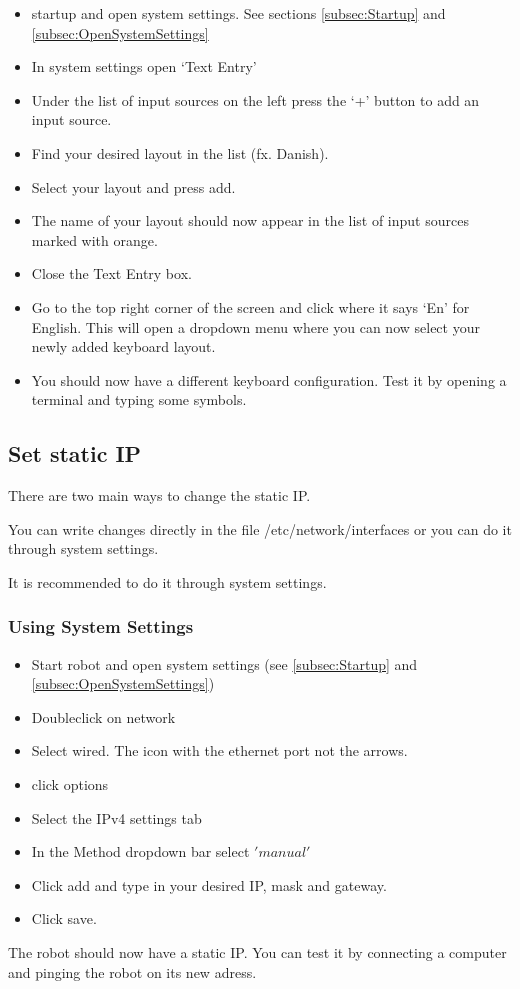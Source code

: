 \documentclass{article}
\begin{document}
\begin{itemize}
\item startup and open system settings. See sections \ref{subsec:Startup} and \ref{subsec:OpenSystemSettings}
\item In system settings open ‘Text Entry’
\item Under the list of input sources on the left press the ‘+’ button to add an input source. 
\item Find your desired layout in the list (fx. Danish). 
\item Select your layout and press add. 
\item The name of your layout should now appear in the list of input sources marked with orange.
\item Close the Text Entry box.
\item Go to the top right corner of the screen and click where it says ‘En’ for English. This will open a dropdown menu where you can now select your newly added keyboard layout. 
\item You should now have a different keyboard configuration. Test it by opening a terminal and typing some symbols.
\end{itemize}

\subsection{Set static IP}
There are two main ways to change the static IP. 

You can write changes directly in the file /etc/network/interfaces or you can do it through system settings. 

It is recommended to do it through system settings. 

\subsubsection{Using System Settings}
\begin{itemize}
\item Start robot and open system settings (see \ref{subsec:Startup} and \ref{subsec:OpenSystemSettings})
\item Doubleclick on network
\item Select wired. The icon with the ethernet port not the arrows.
\item click options
\item Select the IPv4 settings tab
\item In the Method dropdown bar select $'manual'$ 
\item Click add and type in your desired IP, mask and gateway. 
\item Click save. 
\end{itemize}
The robot should now have a static IP. You can test it by connecting a computer and pinging the robot on its new adress. 
\end{document}
